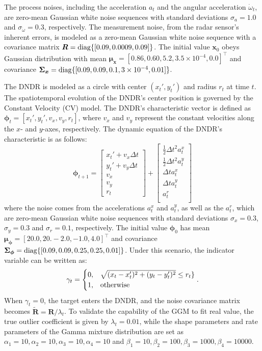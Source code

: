 \documentclass[10pt,twocolumn,twoside]{IEEEtran}
\newcommand{\diag}[1]{{\rm diag}\{#1\}}
\newcommand{\fs}{\text{.}} %
\newcommand{\x}{{ \bm{x} }}
\begin{document}
The process noises, including the acceleration $a_t$ and the angular acceleration $\dot\omega_t$, are zero-mean Gaussian white noise sequences with standard deviations $\sigma_a=1.0$ and $\sigma_{\dot\omega}=0.3$, respectively. The measurement noise, from the radar sensor's inherent errors, is modeled as a zero-mean Gaussian white noise sequence with a covariance matrix $\bm{R}=\diag{[0.09, 0.0009, 0.09]}$. The initial value $\x_0$ obeys Gaussian distribution with mean $\bm{\mu}_{\x} = [0.86,0.60,5.2,3.5\times 10^{-4},0.0]^\top$ and covariance $\bm{\Sigma}_{\x} = \diag{[0.09,0.09,0.1,3\times 10^{-4},0.01]}$.

The DNDR is modeled as a circle with center $(x_t',y_t')$ and radius $r_t$ at time $t$. The spatiotemporal evolution of the DNDR's center position is governed by the Constant Velocity (CV) model. The DNDR's characteristic vector is defined as $\bm\phi_t=[x_t',y_t',v_x,v_y,r_t]$, where $v_x$ and $v_y$ represent the constant velocities along the $x$- and $y$-axes, respectively. The dynamic equation of the DNDR's characteristic is as follows:
\begin{equation*}
    \bm\phi_{t+1} = \begin{bmatrix} 
        x_t'+v_x\Delta t\\ y_t'+v_y\Delta t\\ v_x\\ v_y\\ r_t
    \end{bmatrix} + \begin{bmatrix}
        \frac{1}{2}\Delta t^2a^x_t\\
        \frac{1}{2}\Delta t^2a^y_t\\
        \Delta t a^x_t\\
        \Delta t a^y_t\\
        a^r_t\\
    \end{bmatrix}
\end{equation*}
where the noise comes from the accelerations $a^x_t$ and $a^y_t$, as well as the $a^r_t$, which are zero-mean Gaussian white noise sequences with standard deviations $\sigma_x=0.3$, $\sigma_y=0.3$ and $\sigma_r=0.1$, respectively. 
The initial value $\bm\phi_0$ has mean $\bm{\mu}_{\bm\phi}=[20.0,20.-2.0,-1.0,4.0]^\top$ and covariance $\bm{\Sigma}_{\bm\phi}=\diag{[0.09,0.09,0.25,0.25,0.01]}$. Under this scenario, the indicator variable can be written as:
$$
\gamma_t = \begin{cases}
0, & \sqrt{(x_t-x_t')^2+(y_t-y_t')^2}\leq r_t\} \\
1, & {\rm otherwise}
\end{cases} \fs
$$
When $\gamma_t=0$, the target enters the DNDR, and the noise covariance matrix becomes $\tilde{\bm{R}}=\bm{R}/\lambda_t$. To validate the capability of the GGM to fit real value, the true outlier coefficient is given by $\lambda_t=0.01$, while the shape parameters and rate parameters of the Gamma mixture distribution are set as $\alpha_1=10,\alpha_2=10,\alpha_3=10,\alpha_4=10$ and $\beta_1=10,\beta_2=100,\beta_3=1000,\beta_4=10000$. 
\end{document}
